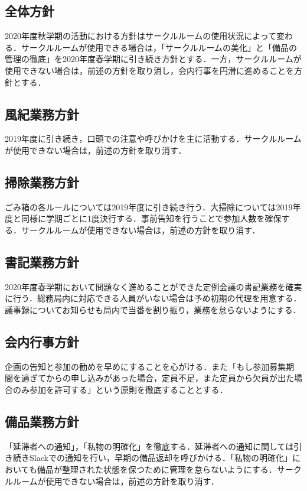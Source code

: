 \subsection*{全体方針}
2020年度秋学期の活動における方針はサークルルームの使用状況によって変わる．サークルルームが使用できる場合は，「サークルルームの美化」と「備品の管理の徹底」を2020年度春学期に引き続き方針とする．一方，サークルルームが使用できない場合は，前述の方針を取り消し，会内行事を円滑に進めることを方針とする．

\subsection*{風紀業務方針}
2019年度に引き続き，口頭での注意や呼びかけを主に活動する．サークルルームが使用できない場合は，前述の方針を取り消す．

\subsection*{掃除業務方針}
ごみ箱の各ルールについては2019年度に引き続き行う．大掃除については2019年度と同様に学期ごとに1度決行する．事前告知を行うことで参加人数を確保する．サークルルームが使用できない場合は，前述の方針を取り消す．

\subsection*{書記業務方針}
2020年度春学期において問題なく進めることができた定例会議の書記業務を確実に行う．総務局内に対応できる人員がいない場合は予め初期の代理を用意する．議事録についてお知らせも局内で当番を割り振り，業務を怠らないようにする．

\subsection*{会内行事方針}
企画の告知と参加の勧めを早めにすることを心がける．また「もし参加募集期間を過ぎてからの申し込みがあった場合，定員不足，また定員から欠員が出た場合のみ参加を許可する」という原則を徹底することとする．

\subsection*{備品業務方針}
「延滞者への通知」，「私物の明確化」を徹底する．延滞者への通知に関しては引き続きSlackでの通知を行い，早期の備品返却を呼びかける．「私物の明確化」においても備品が整理された状態を保つために管理を怠らないようにする．サークルルームが使用できない場合は，前述の方針を取り消す．

